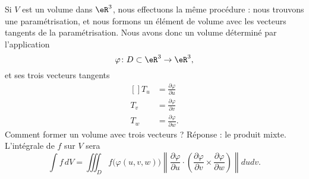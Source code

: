Si $V$ est un volume dans $\eR^3$, nous effectuons la même procédure : nous trouvons une paramétrisation, et nous formons un élément de volume avec les vecteurs tangents de la paramétrisation. Nous avons donc un volume déterminé par l'application
\begin{equation}
    \varphi\colon D\subset\eR^3\to \eR^3,
\end{equation}
et ses trois vecteurs tangents
\begin{equation}
    \begin{aligned}[]
        T_u&=\frac{ \partial \varphi }{ \partial u }\\
        T_v&=\frac{ \partial \varphi }{ \partial v }\\
        T_w&=\frac{ \partial \varphi }{ \partial w }.
    \end{aligned}
\end{equation}
Comment former un volume avec trois vecteurs ? Réponse : le produit mixte. L'intégrale de $f$ sur $V$ sera
\begin{equation}
    \int f\,dV=\iiint_D f\big( \varphi(u,v,w) \big)\left\| \frac{ \partial \varphi }{ \partial u }\cdot \left( \frac{ \partial \varphi }{ \partial v }\times\frac{ \partial \varphi }{ \partial w }\right) \right\|dudv.
\end{equation}

